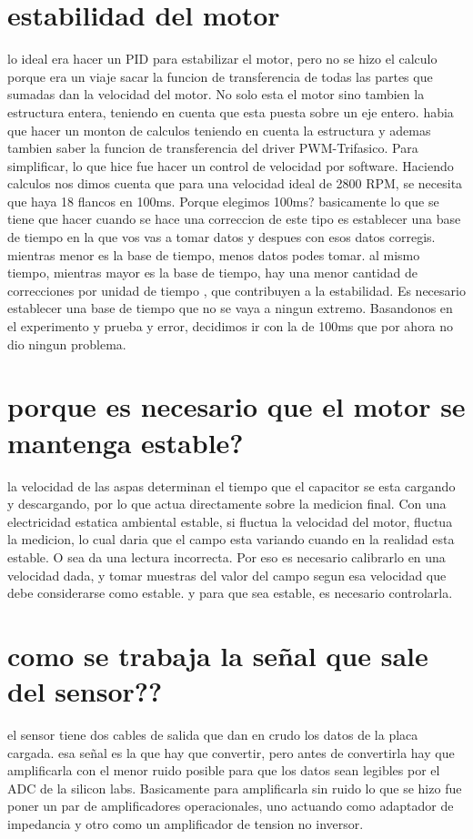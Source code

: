 \documentclass[a4paper]{article}
\begin{document}
\section*{estabilidad del motor}
lo ideal era hacer un PID para estabilizar el motor, pero no se hizo el calculo porque era un viaje sacar la funcion de transferencia de todas las partes que sumadas dan la velocidad del motor. No solo esta el motor sino tambien la estructura entera, teniendo en cuenta que esta puesta sobre un eje entero. habia que hacer un monton de calculos teniendo en cuenta la estructura y ademas tambien saber la funcion de transferencia del driver PWM-Trifasico.
	Para simplificar, lo que hice fue hacer un control de velocidad por software. Haciendo calculos nos dimos cuenta
que para una velocidad ideal de 2800 RPM, se necesita que haya 18 flancos en 100ms. Porque elegimos 100ms? basicamente lo que se tiene que hacer cuando se hace una correccion de este tipo es establecer una base de tiempo en la que vos vas a tomar datos y despues con esos datos corregis. mientras menor es la base de tiempo, menos datos podes tomar. al mismo tiempo, mientras mayor es la base de tiempo, hay una menor cantidad de correcciones por unidad de tiempo , que contribuyen a la estabilidad. Es necesario establecer una base de tiempo que no se vaya a ningun extremo. Basandonos en el experimento y prueba y error, decidimos ir con la de 100ms que por ahora no dio ningun problema.

\section*{porque es necesario que el motor se mantenga estable?}
la velocidad de las aspas determinan el tiempo que el capacitor se esta cargando y descargando, por lo que actua directamente sobre la medicion final. Con una electricidad estatica ambiental estable, si fluctua la velocidad del motor, fluctua la medicion, lo cual daria que el campo esta variando cuando en la realidad esta estable. O sea da una lectura incorrecta. Por eso es necesario calibrarlo en una velocidad dada, y tomar muestras del valor del campo segun esa velocidad que debe considerarse como estable. y para que sea estable, es necesario controlarla.

\section*{como se trabaja la señal que sale del sensor??}
el sensor tiene dos cables de salida que dan en crudo los datos de la placa cargada. esa señal es la que hay que convertir, pero antes de convertirla hay que amplificarla con el menor ruido posible para que los datos sean legibles por el ADC de la silicon labs. Basicamente para amplificarla sin ruido lo que se hizo fue poner un par de amplificadores operacionales, uno actuando como adaptador de impedancia y otro como un amplificador de tension no inversor.
\end{document}
